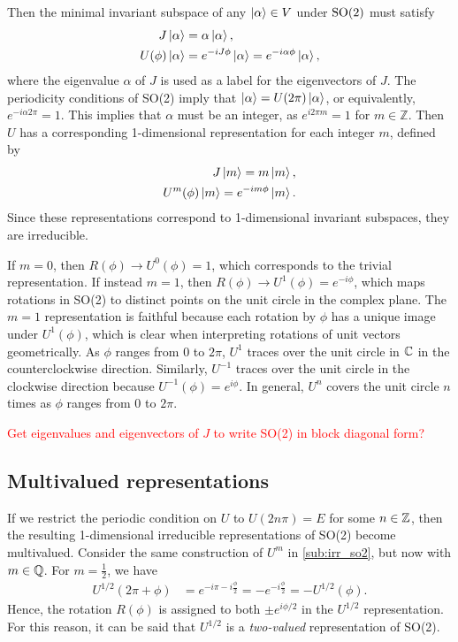     Then the minimal invariant subspace of any $\ket{\alpha}\in V$ under $\textrm{SO}{(2)}$ must satisfy
    \begin{align*}
        J\ket{\alpha} &= \alpha\ket{\alpha}, \\
        U(\phi)\ket{\alpha} &= e^{-iJ\phi}\ket{\alpha} = e^{-i\alpha\phi}\ket{\alpha},
    \end{align*}
    where the eigenvalue $\alpha$ of $J$ is used as a label for the eigenvectors of $J$. The periodicity conditions of SO(2) imply that $\ket{\alpha} = U(2\pi)\ket{\alpha}$, or equivalently, $e^{-i\alpha2\pi} = 1$. This implies that $\alpha$ must be an integer, as $e^{i2\pi m} = 1$ for $m\in\mathbb{Z}$. Then $U$ has a corresponding 1-dimensional representation for each integer $m$, defined by
    \begin{align*}
        J\ket{m} = m\ket{m}, \\
        U^m(\phi)\ket{m} = e^{-im\phi}\ket{m}.
    \end{align*}
    Since these representations correspond to 1-dimensional invariant subspaces, they are irreducible.

    If $m=0$, then $R(\phi)\to U^0(\phi) = 1$, which corresponds to the trivial representation. If instead $m=1$, then $R(\phi)\to U^1(\phi) = e^{-i\phi}$, which maps rotations in SO(2) to distinct points on the unit circle in the complex plane. The $m=1$ representation is faithful because each rotation by $\phi$ has a unique image under $U^1(\phi)$, which is clear when interpreting rotations of unit vectors geometrically. As $\phi$ ranges from 0 to $2\pi$, $U^1$ traces over the unit circle in $\mathbb{C}$ in the counterclockwise direction. Similarly, $U^{-1}$ traces over the unit circle in the clockwise direction because $U^{-1}(\phi)=e^{i\phi}$. In general, $U^n$ covers the unit circle $n$ times as $\phi$ ranges from 0 to $2\pi$.
    
    \textcolor{red}{Get eigenvalues and eigenvectors of $J$ to write SO(2) in block diagonal form?}

    \subsection{Multivalued representations}
    If we restrict the periodic condition on $U$ to $U(2n\pi) = E$ for some $n\in\mathbb{Z}$, then the resulting 1-dimensional irreducible representations of SO(2) become multivalued. Consider the same construction of $U^m$ in \cref{sub:irr_so2}, but now with $m\in\mathbb{Q}$. For $m=\frac{1}{2}$, we have
    \begin{align*}
        U^{1/2}(2\pi + \phi) &= e^{-i\pi -i\frac{\phi}{2}} = -e^{-i\frac{\phi}{2}} = -U^{1/2}(\phi).
    \end{align*}
    Hence, the rotation $R(\phi)$ is assigned to both $\pm e^{i\phi/2}$ in the $U^{1/2}$ representation. For this reason, it can be said that $U^{1/2}$ is a \textit{two-valued} representation of SO(2).
    
